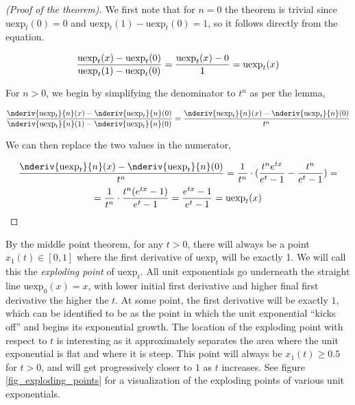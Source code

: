 \documentclass[12pt,a4paper]{article}
\newcommand{\uexp}[1] {{\text{uexp}_{#1}}}
\begin{document}
\begin{proof}[(Proof of the theorem)]
We first note that for $n = 0$ the theorem is trivial since $\uexp{t}(0) = 0$ and $\uexp{t}(1) - \uexp{t}(0) = 1$, so it follows directly from the equation.

\begin{equation}
{{\uexp{t}(x) - \uexp{t}(0)} \over {\uexp{t}(1) - \uexp{t}(0)}} = {{\uexp{t}(x) - 0} \over {1}} = \uexp{t}(x)
\end{equation}

For $n > 0$, we begin by simplifying the denominator to $t^n$ as per the lemma,

\begin{equation}
{{\nderiv{\uexp{t}}{n}(x) - \nderiv{\uexp{t}}{n}(0)} \over {\nderiv{\uexp{t}}{n}(1) - \nderiv{\uexp{t}}{n}(0)}} = {{\nderiv{\uexp{t}}{n}(x) - \nderiv{\uexp{t}}{n}(0)} \over {t^n}}
\end{equation}

We can then replace the two values in the numerator,

\begin{multline}
{{\nderiv{\uexp{t}}{n}(x) - \nderiv{\uexp{t}}{n}(0)} \over {t^n}} = {{1} \over {t^n}} \cdot ({{t^n e^{tx}} \over {e^t - 1}} - {{t^n} \over {e^t - 1}}) = \\
= {{1} \over {t^n}} \cdot {{t^n (e^{tx} - 1)} \over {e^t - 1}} = {{e^{tx} - 1} \over {e^t - 1}} = \uexp{t}(x)\\
\end{multline}
\end{proof}

By the middle point theorem, for any $t > 0$, there will always be a point $x_1(t) \in [0,1]$ where the first derivative of $\uexp{t}$ will be exactly 1. We will call this the {\emph{exploding point}} of $\uexp{t}$. All unit exponentials go underneath the straight line $\uexp{0}(x) = x$, with lower initial first derivative and higher final first derivative the higher the $t$. At some point, the first derivative will be exactly $1$, which can be identified to be as the point in which the unit exponential ``kicks off'' and begins its exponential growth. The location of the exploding point with respect to $t$ is interesting as it approximately separates the area where the unit exponential is flat and where it is steep. This point will always be $x_1(t) \geq 0.5$ for $t > 0$, and will get progressively closer to $1$ as $t$ increases. See figure \ref{fig_exploding_points} for a visualization of the exploding points of various unit exponentials.
\end{document}
